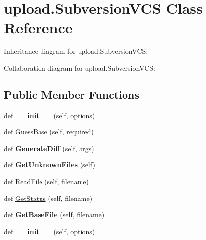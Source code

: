 \hypertarget{classupload_1_1SubversionVCS}{}\section{upload.\+Subversion\+V\+CS Class Reference}
\label{classupload_1_1SubversionVCS}


Inheritance diagram for upload.\+Subversion\+V\+CS\+:


Collaboration diagram for upload.\+Subversion\+V\+CS\+:
\subsection*{Public Member Functions}
\begin{DoxyCompactItemize}
\item 
\mbox{\label{classupload_1_1SubversionVCS_a8333f94e27335ce83eed0cc3f5a1eeb0}} 
def {\bfseries \+\_\+\+\_\+init\+\_\+\+\_\+} (self, options)
\item 
def \hyperlink{classupload_1_1SubversionVCS_a7d22d459469a757270502ce0dccacbd2}{Guess\+Base} (self, required)
\item 
\mbox{\label{classupload_1_1SubversionVCS_a07c2d341f2c7df2772dd7f85e89b0212}} 
def {\bfseries Generate\+Diff} (self, args)
\item 
\mbox{\label{classupload_1_1SubversionVCS_a494ba1010992d83cac015bc396ab693a}} 
def {\bfseries Get\+Unknown\+Files} (self)
\item 
def \hyperlink{classupload_1_1SubversionVCS_a340d269b74386ac863636f6b0683d9f4}{Read\+File} (self, filename)
\item 
def \hyperlink{classupload_1_1SubversionVCS_ac3785eb1fa561088206d01570f9fe982}{Get\+Status} (self, filename)
\item 
\mbox{\label{classupload_1_1SubversionVCS_a29dec4941de0824734d6842a2f33ffc3}} 
def {\bfseries Get\+Base\+File} (self, filename)
\item 
\mbox{\label{classupload_1_1SubversionVCS_a8333f94e27335ce83eed0cc3f5a1eeb0}} 
def {\bfseries \+\_\+\+\_\+init\+\_\+\+\_\+} (self, options)
\item 

\end{DoxyCompactItemize}
